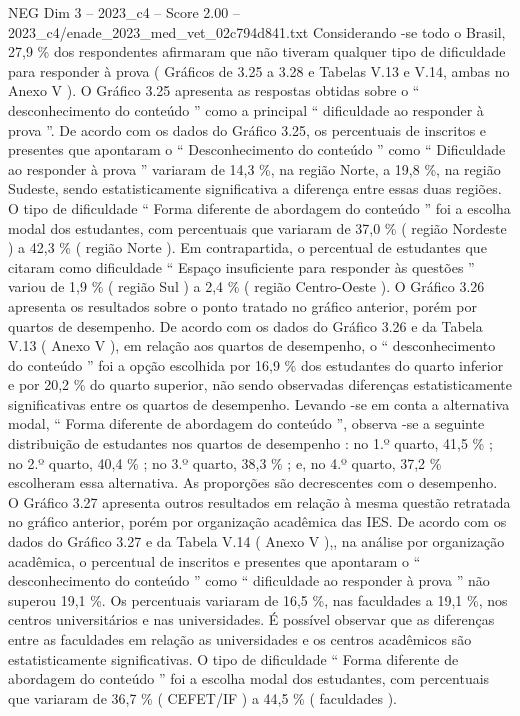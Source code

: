 \begin{textsample}{NEG Dim 3 – 2023\_c4 – Score 2.00 – 2023\_c4/enade\_2023\_med\_vet\_02c794d841.txt}
Considerando -se todo o Brasil, 27,9 \% dos respondentes afirmaram que não tiveram qualquer tipo de dificuldade para responder à prova ( Gráficos de 3.25 a 3.28 e Tabelas V.13 e V.14, ambas no Anexo V ).
O Gráfico 3.25 apresenta as respostas obtidas sobre o “ desconhecimento do conteúdo ” como a principal “ dificuldade ao responder à prova ”.
De acordo com os dados do Gráfico 3.25, os percentuais de inscritos e presentes que apontaram o “ Desconhecimento do conteúdo ” como “ Dificuldade ao responder à prova ” variaram de 14,3 \%, na região Norte, a 19,8 \%, na região Sudeste, sendo estatisticamente significativa a diferença entre essas duas regiões.
O tipo de dificuldade “ Forma diferente de abordagem do conteúdo ” foi a escolha modal dos estudantes, com percentuais que variaram de 37,0 \% ( região Nordeste ) a 42,3 \% ( região Norte ).
Em contrapartida, o percentual de estudantes que citaram como dificuldade “ Espaço insuficiente para responder às questões ” variou de 1,9 \% ( região Sul ) a 2,4 \% ( região Centro-Oeste ).
O Gráfico 3.26 apresenta os resultados sobre o ponto tratado no gráfico anterior, porém por quartos de desempenho.
De acordo com os dados do Gráfico 3.26 e da Tabela V.13 ( Anexo V ), em relação aos quartos de desempenho, o “ desconhecimento do conteúdo ” foi a opção escolhida por 16,9 \% dos estudantes do quarto inferior e por 20,2 \% do quarto superior, não sendo observadas diferenças estatisticamente significativas entre os quartos de desempenho.
Levando -se em conta a alternativa modal, “ Forma diferente de abordagem do conteúdo ”, observa -se a seguinte distribuição de estudantes nos quartos de desempenho : no 1.º quarto, 41,5 \% ; no 2.º quarto, 40,4 \% ; no 3.º quarto, 38,3 \% ; e, no 4.º quarto, 37,2 \% escolheram essa alternativa.
As proporções são decrescentes com o desempenho.
O Gráfico 3.27 apresenta outros resultados em relação à mesma questão retratada no gráfico anterior, porém por organização acadêmica das IES.
De acordo com os dados do Gráfico 3.27 e da Tabela V.14 ( Anexo V ),, na análise por organização acadêmica, o percentual de inscritos e presentes que apontaram o “ desconhecimento do conteúdo ” como “ dificuldade ao responder à prova ” não superou 19,1 \%.
Os percentuais variaram de 16,5 \%, nas faculdades a 19,1 \%, nos centros universitários e nas universidades.
É possível observar que as diferenças entre as faculdades em relação as universidades e os centros acadêmicos são estatisticamente significativas.
O tipo de dificuldade “ Forma diferente de abordagem do conteúdo ” foi a escolha modal dos estudantes, com percentuais que variaram de 36,7 \% ( CEFET/IF ) a 44,5 \% ( faculdades ).

\end{textsample}
